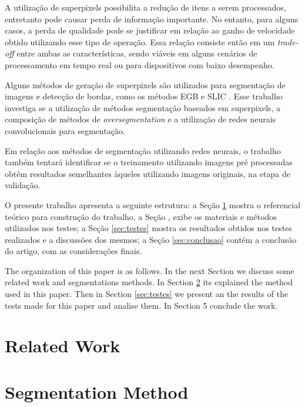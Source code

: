 \documentclass[10pt,twocolumn,letterpaper]{article}
\begin{document}
A utilização de superpixels possibilita a redução de itens a serem processados, entretanto pode causar perda de informação importante. No entanto, para alguns casos, a perda de qualidade pode se justificar em relação ao ganho de velocidade obtido utilizando esse tipo de operação. Essa relação consiste então em um \textit{trade-off} entre ambas as características, sendo viáveis em alguns cenários de processamento em tempo real ou para dispositivos com baixo desempenho.

Alguns métodos de geração de superpixels são utilizados para segmentação de imagens e detecção de bordas, como os métodos EGB \cite{FELZENSZWALB} e SLIC \cite{SLIC}. Esse trabalho investiga se a utilização de métodos segmentação baseados em superpixels, a composição de métodos de \textit{oversegmentation} e a utilização de redes neurais convolucionais para segmentação. 

Em relação aos métodos de segmentação utilizando redes neurais, o trabalho também tentará identificar se o treinamento utilizando imagens pré processadas obtêm resultados semelhantes àqueles utilizando imagens originais, na etapa de validação.

O presente trabalho apresenta a seguinte estrutura: a Seção \ref{sec:ref_teorico} mostra o referencial teórico para construção do trabalho, a Seção  , exibe os materiais e métodos utilizados nos testes; a Seção \ref{sec:testes} mostra os resultados obtidos nos testes realizados e a discussões dos mesmos; a Seção \ref{sec:conclusao} contém a conclusão do artigo, com as considerações finais.

The organization of this paper is as follows. In the next Section we discuss some related work and segmentations methods.  In Section \ref{sec:mat_metodos} its explained the method used in this paper. Then in Section \ref{sec:testes} we present an the results of the tests made for this paper and analise them. In Section 5 conclude the work.

\section{Related Work} \label{sec:ref_teorico}

\section{Segmentation Method} \label{sec:mat_metodos}
\end{document}
